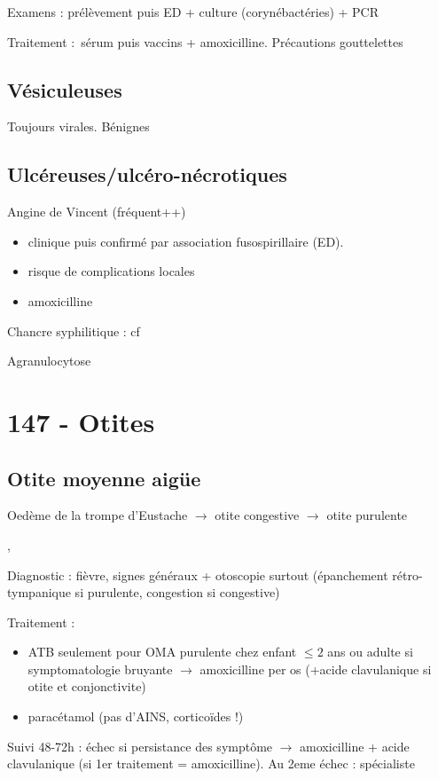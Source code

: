 Examens : prélèvement puis ED + culture (corynébactéries) + PCR

Traitement : sérum puis vaccins + amoxicilline. Précautions gouttelettes

\subsection{Vésiculeuses}%
Toujours virales. Bénignes


\subsection{Ulcéreuses/ulcéro-nécrotiques}
Angine de Vincent (fréquent++) 
\begin{itemize}
  \item clinique puis confirmé par association fusospirillaire (ED).
  \item risque de complications locales
  \item amoxicilline
\end{itemize}

Chancre syphilitique : cf~

Agranulocytose

\section{147 - Otites}%
\label{sec:otites}
\subsection{Otite moyenne aigüe}%
\label{sub:otite_moyenn_aigue}
Oedème de la trompe d'Eustache $\to$ otite congestive $\to$ otite purulente

, 

Diagnostic : fièvre, signes généraux + otoscopie surtout (épanchement
rétro-tympanique si purulente, congestion si congestive)

Traitement : 
\begin{itemize}
  \item ATB seulement pour OMA purulente chez enfant $\le 2$ ans ou adulte si
symptomatologie bruyante
$\rightarrow$ amoxicilline per os (+acide clavulanique si otite et conjonctivite)
\item paracétamol (pas d'AINS, corticoïdes !)
\end{itemize}

Suivi 48-72h : échec si persistance des symptôme $\rightarrow$ amoxicilline +
acide clavulanique (si 1er traitement = amoxicilline). Au 2eme échec :
spécialiste

